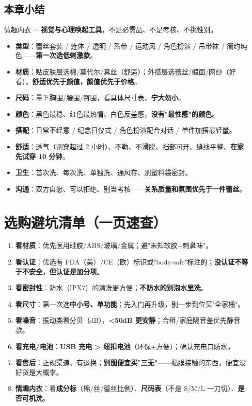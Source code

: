 \documentclass[12pt,UTF8,openany]{ctexbook}
\begin{document}
\subsection*{本章小结}
情趣内衣 = \textbf{视觉与心理唤起工具}，不是必需品、不是考核、不挑性别。
\begin{itemize}[leftmargin=2em,itemsep=0.2em]
  \item \textbf{类型}：蕾丝套装 / 连体 / 透明 / 系带 / 运动风 / 角色扮演 / 吊带袜 / 简约纯色——\textbf{第一次选低刺激款}。
  \item \textbf{材质}：贴皮肤层选棉/莫代尔/真丝（舒适）；外搭层选蕾丝/缎面/网纱（好看）。\textbf{舒适优先于颜值，颜值优先于价格}。
  \item \textbf{尺码}：量下胸围/腰围/臀围，看具体尺寸表，\textbf{宁大勿小}。
  \item \textbf{颜色}：黑色最稳、红色最热情、白色反差感，\textbf{没有"最性感"的颜色}。
  \item \textbf{搭配}：日常不经意 / 纪念日仪式 / 角色扮演配合对话 / 单件加搭最轻量。
  \item \textbf{舒适}：透气（别穿超过 2 小时）、不勒、不滑脱、裆部可开、缝线平整、\textbf{在家先试穿 10 分钟}。
  \item \textbf{卫生}：首次洗、每次洗、单独洗、通风存、别塑料袋密封。
  \item \textbf{沟通}：双方自愿、可以拒绝、别当考核——\textbf{关系质量和氛围优先于一件蕾丝}。
\end{itemize}

\section{选购避坑清单（一页速查）}
\begin{enumerate}[leftmargin=2em,itemsep=0.2em]
  \item \textbf{看材质}：优先医用硅胶/ABS/玻璃/金属；避"未知软胶+刺鼻味"。
  \item \textbf{看认证}：优选有 FDA（美）/CE（欧）标识或"body-safe"标注的；\textbf{没认证不等于不安全，但认证是加分项}。
  \item \textbf{看密封性}：防水（IPX7）的清洗更方便；\textbf{不防水的别泡水里洗}。
  \item \textbf{看尺寸}：第一次选\textbf{中小号、单功能}；先入门再升级，别一步到位买"全家桶"。
  \item \textbf{看噪音}：振动类看分贝（dB），\textbf{<50dB 更安静}；合租/家庭隔音差优先静音款。
  \item \textbf{看充电/电池}：\textbf{USB 充电 > 纽扣电池}（环保+方便）；确认充电口防水。
  \item \textbf{看售后}：正规渠道、有退换；\textbf{别图便宜买"三无"}——黏膜接触的东西，便宜没好货是大概率。
  \item \textbf{情趣内衣}：看\textbf{成分标}（棉/丝/蕾丝比例）、\textbf{尺码表}（不是 S/M/L 一刀切）、\textbf{是否可机洗}。
\end{enumerate}
\end{document}
